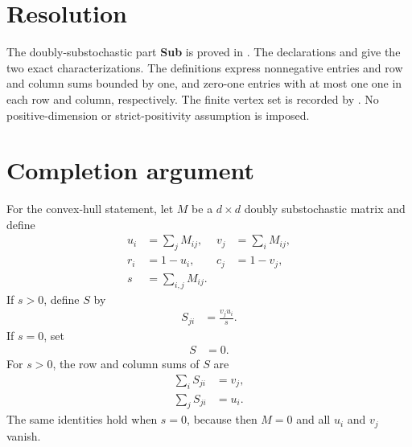 \documentclass{article}
\begin{document}
\section{Resolution}

The doubly-substochastic part \textbf{Sub} is proved in
. The declarations
 and
 give the two
exact characterizations. The definitions express nonnegative entries and
row and column sums bounded by one, and zero-one entries with at most one
one in each row and column, respectively. The finite vertex set is recorded
by . No positive-dimension or
strict-positivity assumption is imposed.

\section{Completion argument}

For the convex-hull statement, let $M$ be a $d\times d$ doubly
substochastic matrix and define
\begin{align}
    u_i
        &=\sum_j M_{ij},
    &
    v_j
        &=\sum_i M_{ij},
    \label{eq:wolf_ch8_birkhoff_doubly_substochastic_gap_row_column_sums}\\
    r_i
        &=1-u_i,
    &
    c_j
        &=1-v_j,
    \label{eq:wolf_ch8_birkhoff_doubly_substochastic_gap_row_column_deficits}\\
    s
        &=\sum_{i,j}M_{ij}.
    \label{eq:wolf_ch8_birkhoff_doubly_substochastic_gap_total_mass}
\end{align}
If $s>0$, define $S$ by
\begin{align}
    S_{ji}
        &=\frac{v_ju_i}{s}.
    \label{eq:wolf_ch8_birkhoff_doubly_substochastic_gap_completion_block_positive_mass}
\end{align}
If $s=0$, set
\begin{align}
    S
        &=0.
    \label{eq:wolf_ch8_birkhoff_doubly_substochastic_gap_completion_block_zero_mass}
\end{align}
For $s>0$, the row and column sums of $S$ are
\begin{align}
    \sum_i S_{ji}
        &=v_j,
    \label{eq:wolf_ch8_birkhoff_doubly_substochastic_gap_completion_row_sum}\\
    \sum_j S_{ji}
        &=u_i.
    \label{eq:wolf_ch8_birkhoff_doubly_substochastic_gap_completion_column_sum}
\end{align}
The same identities hold when $s=0$, because then $M=0$ and all $u_i$ and
$v_j$ vanish.
\end{document}

